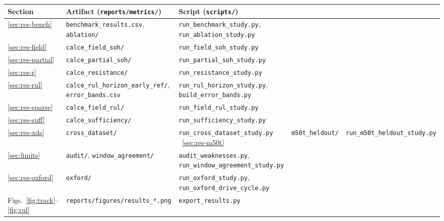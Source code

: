 \documentclass[preprint,12pt,authoryear]{elsarticle}
\begin{document}
\begin{table}[h]
\centering
\small
\begin{tabular}{p{}p{}p{}}
\toprule
Section & Artifact (\texttt{reports/metrics/}) & Script (\texttt{scripts/}) \\
\midrule
\ref{sec:res-bench} & \texttt{benchmark\_results.csv}, \texttt{ablation/} & \texttt{run\_benchmark\_study.py}, \texttt{run\_ablation\_study.py} \\
\ref{sec:res-field} & \texttt{calce\_field\_soh/} & \texttt{run\_field\_soh\_study.py} \\
\ref{sec:res-partial} & \texttt{calce\_partial\_soh/} & \texttt{run\_partial\_soh\_study.py} \\
\ref{sec:res-r} & \texttt{calce\_resistance/} & \texttt{run\_resistance\_study.py} \\
\ref{sec:res-rul} & \texttt{calce\_rul\_horizon\_early\_ref/}, \texttt{error\_bands.csv} & \texttt{run\_rul\_horizon\_study.py}, \texttt{build\_error\_bands.py} \\
\ref{sec:res-sparse} & \texttt{calce\_field\_rul/} & \texttt{run\_field\_rul\_study.py} \\
\ref{sec:res-suff} & \texttt{calce\_sufficiency/} & \texttt{run\_sufficiency\_study.py} \\
\ref{sec:res-xds} & \texttt{cross\_dataset/} & \texttt{run\_cross\_dataset\_study.py} \
\ref{sec:res-m50t} & \texttt{m50t\_heldout/} & \texttt{run\_m50t\_heldout\_study.py} \\
\ref{sec:limits} & \texttt{audit/}, \texttt{window\_agreement/} & \texttt{audit\_weaknesses.py}, \texttt{run\_window\_agreement\_study.py} \\
\ref{sec:res-oxford} & \texttt{oxford/} & \texttt{run\_oxford\_study.py}, \texttt{run\_oxford\_drive\_cycle.py} \\
Figs.~\ref{fig:track}--\ref{fig:rul} & \texttt{reports/figures/results\_*.png} & \texttt{export\_results.py} \\
\bottomrule
\end{tabular}
\end{table}



\end{document}
